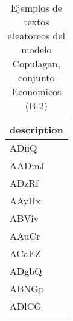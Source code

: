 \begin{table}[H]
\centering
\fontsize{8}{14}\selectfont
\caption{Ejemplos de textos aleatoreos del modelo Copulagan, conjunto Economicos (B-2)}
\label{table-sample10-economicos-b-2-copulagan-text}
\begin{tabular}{|m{50em}|}
\hline
\rowcolor[gray]{0.8}
description \\
\hline ADiiQ \\
\hline AADmJ \\
\hline ADzRf \\
\hline AAyHx \\
\hline ABViv \\
\hline AAuCr \\
\hline ACaEZ \\
\hline ADgbQ \\
\hline ABNGp \\
\hline ADlCG \\
\hline
\end{tabular}
\end{table}
